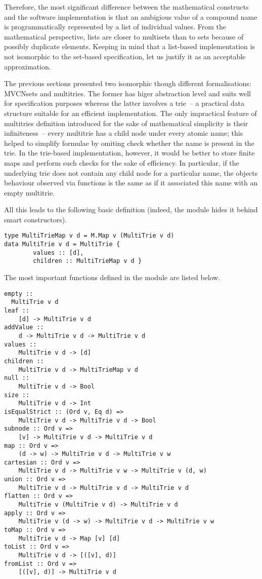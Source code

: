 \documentclass{article}
\theoremstyle{definition}
\begin{document}
Therefore, the most significant difference between the mathematical constructs
and the software implementation is that an ambigious value of a compound name is
programmatically represented by a list of individual values.  From the
mathematical perspective, lists are closer to multisets than to sets because of
possibly duplicate elements.  Keeping in mind that a list-based implementation
is not isomorphic to the set-based specification, let us justify it as an
acceptable approximation.

The previous sections presented two isomorphic though different formalisations:
MVCNsets and multitries. The former has higer abstraction level and suits well
for specification purposes whereas the latter involves a trie~-- a practical
data structure suitable for an efficient implementation. The only impractical
feature of multitries definition introduced for the sake of mathematical
simplicity is their infiniteness~-- every multitrie has a child node under
every atomic name; this helped to simplify formulae by omiting check whether the
name is present in the trie.  In the trie-based implementation, however, it would be
better to store finite maps and perform such checks for the sake of efficiency.
In particular, if the underlying trie does not contain any child node for a
particular name, the objects behaviour observed via functions is the same as if
it associated this name with an empty multitrie.

All this leads to the following basic definition (indeed, the module hides it
behind smart constructors).

\begin{lstlisting}
type MultiTrieMap v d = M.Map v (MultiTrie v d) 
data MultiTrie v d = MultiTrie {
        values :: [d],
        children :: MultiTrieMap v d }
\end{lstlisting}

The most important functions defined in the module are listed below.

\begin{lstlisting}
empty ::
  MultiTrie v d
leaf ::
    [d] -> MultiTrie v d
addValue ::
    d -> MultiTrie v d -> MultiTrie v d
values ::
    MultiTrie v d -> [d]
children ::
    MultiTrie v d -> MultiTrieMap v d
null ::
    MultiTrie v d -> Bool
size ::
    MultiTrie v d -> Int
isEqualStrict :: (Ord v, Eq d) =>
    MultiTrie v d -> MultiTrie v d -> Bool
subnode :: Ord v =>
    [v] -> MultiTrie v d -> MultiTrie v d
map :: Ord v =>
    (d -> w) -> MultiTrie v d -> MultiTrie v w
cartesian :: Ord v =>
    MultiTrie v d -> MultiTrie v w -> MultiTrie v (d, w)
union :: Ord v =>
    MultiTrie v d -> MultiTrie v d -> MultiTrie v d
flatten :: Ord v =>
    MultiTrie v (MultiTrie v d) -> MultiTrie v d
apply :: Ord v =>
    MultiTrie v (d -> w) -> MultiTrie v d -> MultiTrie v w
toMap :: Ord v =>
    MultiTrie v d -> Map [v] [d]
toList :: Ord v =>
    MultiTrie v d -> [([v], d)]
fromList :: Ord v =>
    [([v], d)] -> MultiTrie v d
\end{lstlisting}
\end{document}
